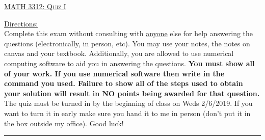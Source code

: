 \documentclass[10pt, a4paper]{article}
\theoremstyle{break}
\begin{document}
\begin{center}
{\large \textsc{\underline{MATH 3312: Quiz I}}}
\vspace{0.125in}
\end{center}
\underline{Directions:} \\
Complete this exam without consulting with \underline{anyone} else for help answering the questions (electronically, in person, etc). You may use your notes, the notes on canvas and your textbook. Additionally, you are allowed to use numerical computing software to aid you in answering the questions. \textbf{You must show all of your work. If you use numerical software then write in the command you used. Failure to show all of the steps used to obtain your solution will result in NO points being awarded for that question. } 
\noindent The quiz must be turned in by the beginning of class on Weds 2/6/2019. If you want to turn it in early make sure you hand it to me in person (don't put it in the box outside my office). Good luck! \\
\noindent\rule{15cm}{0.4pt}

\vspace{0.25in}
\end{document}

